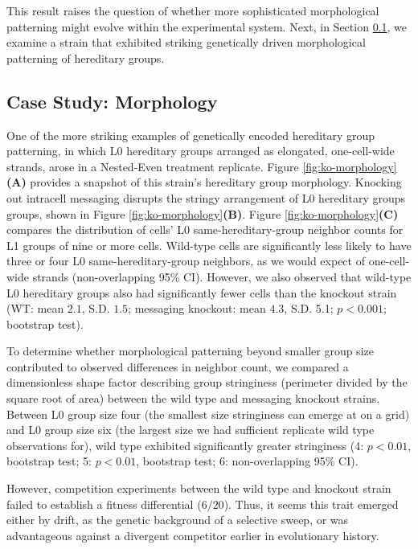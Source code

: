 This result raises the question of whether more sophisticated morphological patterning might evolve within the experimental system.
Next, in Section \ref{sec:morphology}, we examine a strain that exhibited striking genetically driven morphological patterning of hereditary groups.

\subsection{Case Study: Morphology} \label{sec:morphology}



One of the more striking examples of genetically encoded hereditary group patterning, in which L0 hereditary groups arranged as elongated, one-cell-wide strands, arose in a Nested-Even treatment replicate.
Figure \ref{fig:ko-morphology}\textbf{(A)} provides a snapshot of this strain's hereditary group morphology.
Knocking out intracell messaging disrupts the stringy arrangement of L0 hereditary groups groups, shown in Figure \ref{fig:ko-morphology}\textbf{(B)}.
Figure \ref{fig:ko-morphology}\textbf{(C)} compares the distribution of cells' L0 same-hereditary-group neighbor counts for L1 groups of nine or more cells.
Wild-type cells are significantly less likely to have three or four L0 same-hereditary-group neighbors, as we would expect of one-cell-wide strands (non-overlapping 95\% CI).
However, we also observed that wild-type L0 hereditary groups also had significantly fewer cells than the knockout strain
(WT: mean $2.1$, S.D. $1.5$; messaging knockout: mean $4.3$, S.D. 5.1; $p < 0.001$; bootstrap test).

To determine whether morphological patterning beyond smaller group size contributed to observed differences in neighbor count, we compared a dimensionless shape factor describing group stringiness (perimeter divided by the square root of area) between the wild type and messaging knockout strains.
Between L0 group size four (the smallest size stringiness can emerge at on a grid) and L0 group size six (the largest size we had sufficient replicate wild type observations for), wild type exhibited significantly greater stringiness
(4: $p < 0.01$, bootstrap test; 5: $p < 0.01$, bootstrap test; 6: non-overlapping 95\% CI).

However, competition experiments between the wild type and knockout strain failed to establish a fitness differential ($6/20$).
Thus, it seems this trait emerged either by drift, as the genetic background of a selective sweep, or was advantageous against a divergent competitor earlier in evolutionary history.


